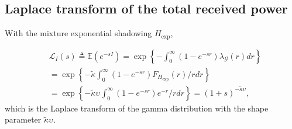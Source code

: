 \documentclass[lettersize,journal]{IEEEtran}
\begin{document}



\subsection{Laplace transform of the total received power}

With the mixture exponential shadowing ${H}_{\text{exp}}$, 

\begin{align}
  \label{eq:lapdef}
  &\mathcal{L}_{I}(s)\triangleq \mathbb{E}\left(e^{-sI}\right)= \exp\left\{-\int_0^{\infty}(1-e^{-sr}) \lambda_{\mathcal{G}}(r) dr \right\} \nonumber \\
  &=\exp\left\{-\tilde{\kappa}\int_0^{\infty}(1-e^{-sr}) F_{{H}_{\text{exp}}}(r) /r dr \right\} \nonumber \\
  &=\exp\left\{-\tilde{\kappa}\upsilon_{}\int_0^{\infty}(1-e^{-sr}) e^{-r} /r dr \right\} =(1+s)^{-\tilde{\kappa}\upsilon_{}},
\end{align}
which is the Laplace transform of the gamma distribution with the shape parameter $\tilde{\kappa}\upsilon_{}$. 
\end{document}
